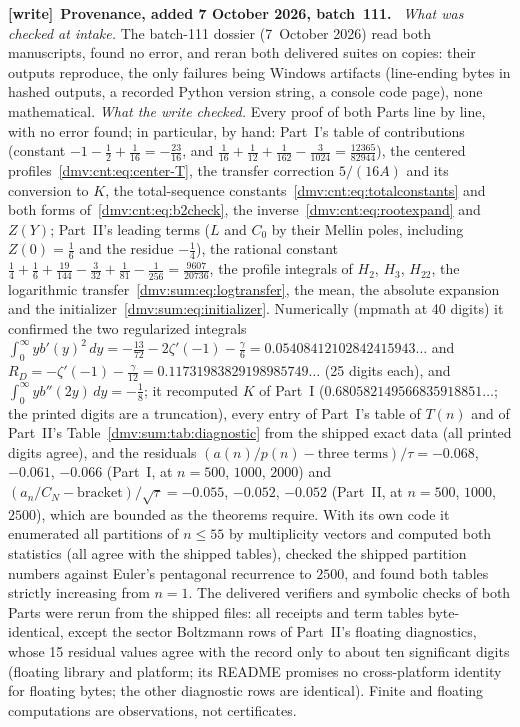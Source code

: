 \documentclass[11pt,letterpaper]{article}
\numberwithin{equation}{section}
\theoremstyle{definition}\newtheorem{definition}[theorem]{Definition}
\theoremstyle{remark}\newtheorem{remark}[theorem]{Remark}
\newenvironment{writenote}[1][]{\par\smallskip\begingroup\small
 \noindent\textbf{[write]}\if\relax\detokenize{#1}\relax\else~\textbf{#1.}\fi\ }%
 {\par\endgroup\smallskip}
\begin{document}
\begin{writenote}[Provenance, added 7 October 2026, batch~111]
\emph{What was checked at intake.} The batch-111 dossier (7~October 2026)
read both manuscripts, found no error, and reran both delivered suites on
copies: their outputs reproduce, the only failures being Windows artifacts
(line-ending bytes in hashed outputs, a recorded Python version string, a
console code page), none mathematical. \emph{What the write checked.} Every
proof of both Parts line by line, with no error found; in particular, by
hand: Part~I's table of contributions (constant $-1-\tfrac12+\tfrac1{16}=
-\tfrac{23}{16}$, and $\tfrac1{16}+\tfrac1{12}+\tfrac1{162}-\tfrac3{1024}=
\tfrac{12365}{82944}$), the centered profiles~\eqref{dmv:cnt:eq:center-T},
the transfer correction $5/(16A)$ and its conversion to $K$, the total-sequence
constants~\eqref{dmv:cnt:eq:totalconstants} and both forms
of~\eqref{dmv:cnt:eq:b2check}, the inverse~\eqref{dmv:cnt:eq:rootexpand}
and $Z(Y)$; Part~II's leading terms ($L$ and $C_0$ by their Mellin poles,
including $Z(0)=\tfrac16$ and the residue $-\tfrac14$), the rational
constant $\tfrac14+\tfrac16+\tfrac{19}{144}-\tfrac3{32}+\tfrac1{81}-\tfrac1{256}
=\tfrac{9607}{20736}$, the profile integrals of $H_2$, $H_3$, $H_{22}$, the
logarithmic transfer~\eqref{dmv:sum:eq:logtransfer}, the mean, the absolute
expansion and the initializer~\eqref{dmv:sum:eq:initializer}. Numerically
(mpmath at 40 digits) it confirmed the two regularized integrals
$\int_0^\infty yb'(y)^2\,dy=-\tfrac{13}{72}-2\zeta'(-1)-\tfrac\gamma6
=0.05408412102842415943\ldots$ and $R_D=-\zeta'(-1)-\tfrac\gamma{12}
=0.11731983829198985749\ldots$ (25 digits each), and
$\int_0^\infty yb''(2y)\,dy=-\tfrac18$; it recomputed $K$ of Part~I
($0.680582149566835918851\ldots$; the printed digits are a truncation), every
entry of Part~I's table of $T(n)$ and of Part~II's Table~\ref{dmv:sum:tab:diagnostic}
from the shipped exact data (all printed digits agree), and the residuals
$(a(n)/p(n)-\text{three terms})/\tau=-0.068$, $-0.061$, $-0.066$ (Part~I, at
$n=500$, $1000$, $2000$) and $(a_n/C_N-\text{bracket})/\sqrt\tau=-0.055$,
$-0.052$, $-0.052$ (Part~II, at $n=500$, $1000$, $2500$), which are bounded
as the theorems require. With its own code it enumerated all partitions of
$n\le55$ by multiplicity vectors and computed both statistics (all agree with
the shipped tables), checked the shipped partition numbers against Euler's
pentagonal recurrence to $2500$, and found both tables strictly increasing
from $n=1$. The delivered verifiers and symbolic checks of both Parts were
rerun from the shipped files: all receipts and term tables byte-identical,
except the sector Boltzmann rows of Part~II's floating diagnostics, whose
15 residual values agree with the record only to about ten significant
digits (floating library and platform; its README promises no
cross-platform identity for floating bytes; the other diagnostic rows are
identical). Finite and floating
computations are observations, not certificates.


\end{writenote}
\end{document}

